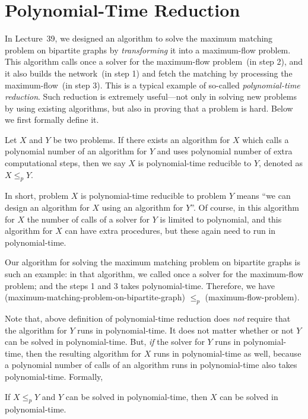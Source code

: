 \section{Polynomial-Time Reduction}

In Lecture~39, we designed an algorithm to solve the maximum matching problem on bipartite graphs
by \emph{transforming} it into a maximum-flow problem. This algorithm calls once a
solver for the maximum-flow problem~(in step 2), and it also builds the network~(in step 1)
and fetch the matching by processing the maximum-flow~(in step 3). This is a typical
example of so-called \emph{polynomial-time reduction}.
Such {reduction} is extremely useful---not only in solving new problems by using existing algorithms,
but also in proving that a problem is hard. Below we first formally define it.

\begin{definition}
Let $X$ and $Y$ be two problems.
If there exists an algorithm for $X$ which
calls a polynomial number of an algorithm for $Y$
and uses polynomial number of extra computational steps,
then we say $X$ is polynomial-time reducible to $Y$, denoted as $X \le_p Y$.
\end{definition}

In short, problem $X$ is polynomial-time reducible to problem $Y$ means ``we can design an algorithm for $X$ using an algorithm for $Y$''.
Of course, in this algorithm for $X$ the number of calls of a solver for $Y$ is limited to polynomial, and this algorithm for $X$
can have extra procedures, but these again need to run in polynomial-time.

Our algorithm for solving the maximum matching problem on bipartite graphs is such an example:
in that algorithm, we called once a solver for the maximum-flow problem; and the steps 1 and 3
takes polynomial-time. Therefore, we have (maximum-matching-problem-on-bipartite-graph) $\le_p$ (maximum-flow-problem).

Note that, above definition of polynomial-time reduction does \emph{not} require that
the algorithm for $Y$ runs in polynomial-time. It does not matter whether or not $Y$ can
be solved in polynomial-time. But, \emph{if} the solver for $Y$ runs in polynomial-time,
then the resulting algorithm for $X$ runs in polynomial-time as well, because 
a polynomial number of calls of an algorithm runs in polynomial-time also takes polynomial-time.
Formally,
\begin{fact}
If $X\le_p Y$ and $Y$ can be solved in polynomial-time, then $X$ can be solved in polynomial-time.
\end{fact}

